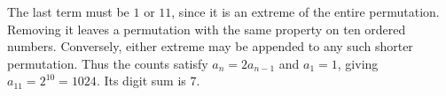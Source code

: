 The last term must be $1$ or $11$, since it is an extreme of the entire permutation. Removing it leaves a permutation with the same property on ten ordered numbers. Conversely, either extreme may be appended to any such shorter permutation. Thus the counts satisfy $a_n=2a_{n-1}$ and $a_1=1$, giving $a_{11}=2^{10}=1024$. Its digit sum is $\boxed7$.
